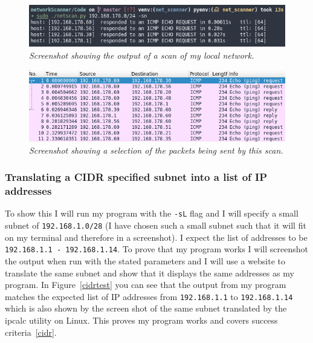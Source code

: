 \documentclass[titlepage]{article}
\let\Oldsubsubsection\subsubsection{}
\renewcommand{\subsubsection}{\FloatBarrier\Oldsubsubsection}
\begin{document}
\begin{figure}[H]
  \centering
  \includegraphics[width=\textwidth]{pingscantest.png}
  \caption{\textit{%
    Screenshot showing the output of a scan of my local network.
}}\label{lanscantest}
\end{figure}

\begin{figure}[H]
  \centering
  \includegraphics[width=\textwidth]{pingscantest_Wireshark.png}
  \caption{\textit{%
    Screenshot showing a selection of the packets being sent by this scan.
}}\label{lanscanWireshark}
\end{figure}

\subsubsection{Translating a CIDR specified subnet into a list of IP addresses}
To show this I will run my program with the \verb|-sL| flag and I will specify
a small subnet of \verb|192.168.1.0/28| (I have chosen such a small subnet
such that it will fit on my terminal and therefore in a screenshot).
I expect the list of addresses to be \verb|192.168.1.1 - 192.168.1.14|.
To prove that my program works I will screenshot the output when run with the
stated parameters and I will use a website to translate the same subnet and show
that it displays the same addresses as my program.
In Figure~\ref{cidrtest} you can see that the output from my program matches
the expected list of IP addresses from \verb|192.168.1.1| to \verb|192.168.1.14|
which is also shown by the screen shot of the same subnet translated by
the ipcalc utility on Linux.
This proves my program works and covers success criteria~\ref{cidr}.
\end{document}
